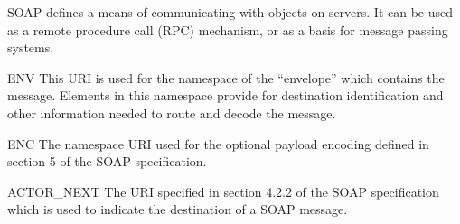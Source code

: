 \documentclass{howto}
\begin{document}
\begin{classdesc*}{SOAP}
  defines a means of communicating with objects on servers. It can be
  used as a remote procedure call (RPC) mechanism, or as a basis for
  message passing systems.

  \begin{memberdesc}{ENV}
    This URI is used for the namespace of the ``envelope'' which
    contains the message.  Elements in this namespace provide for
    destination identification and other information needed to route
    and decode the message.
  \end{memberdesc}

  \begin{memberdesc}{ENC}
    The namespace URI used for the optional payload encoding defined
    in section 5 of the SOAP specification.
  \end{memberdesc}

  \begin{memberdesc}{ACTOR_NEXT}
    The URI specified in section 4.2.2 of the SOAP specification which
    is used to indicate the destination of a SOAP message.
  \end{memberdesc}
\end{classdesc*}
\end{document}
